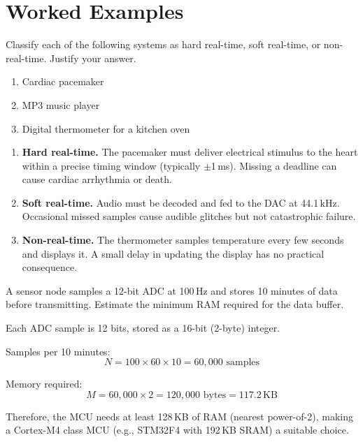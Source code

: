 \section{Worked Examples}
\label{sec:intro:examples}

\begin{example}
Classify each of the following systems as hard real-time, soft real-time, or non-real-time. Justify your answer.
\begin{enumerate}[label=(\alph*)]
  \item Cardiac pacemaker
  \item MP3 music player
  \item Digital thermometer for a kitchen oven
\end{enumerate}

\begin{solution}
\begin{enumerate}[label=(\alph*)]
  \item \textbf{Hard real-time.} The pacemaker must deliver electrical stimulus to the heart within a precise timing window (typically $\pm$1\,ms). Missing a deadline can cause cardiac arrhythmia or death.
  \item \textbf{Soft real-time.} Audio must be decoded and fed to the DAC at 44.1\,kHz. Occasional missed samples cause audible glitches but not catastrophic failure.
  \item \textbf{Non-real-time.} The thermometer samples temperature every few seconds and displays it. A small delay in updating the display has no practical consequence.
\end{enumerate}
\end{solution}
\end{example}

\begin{example}
A sensor node samples a 12-bit ADC at 100\,Hz and stores 10 minutes of data before transmitting. Estimate the minimum RAM required for the data buffer.

\begin{solution}
Each ADC sample is 12 bits, stored as a 16-bit (2-byte) integer.

Samples per 10 minutes:
\[
  N = 100 \times 60 \times 10 = 60{,}000 \text{ samples}
\]

Memory required:
\[
  M = 60{,}000 \times 2 = 120{,}000 \text{ bytes} = 117.2\,\text{KB}
\]

Therefore, the MCU needs at least 128\,KB of RAM (nearest power-of-2), making a Cortex-M4 class MCU (e.g., STM32F4 with 192\,KB SRAM) a suitable choice.
\end{solution}
\end{example}

